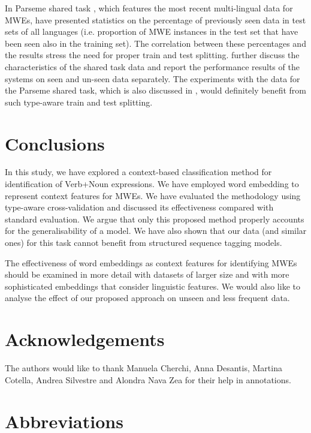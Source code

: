 \documentclass[output=paper
,modfonts
,nonflat]{langsci/langscibook}
\begin{document}
In Parseme shared task \citep{MWEWorkshop}, which features the most recent multi-lingual data for MWEs, \cite{maldonado2017} have presented statistics on the percentage of previously seen data in test sets of all languages (i.e. proportion of MWE instances in the test set that have been seen also in the training set). The correlation between these percentages and the results stress the need for proper train and test splitting.   further discuss the characteristics of the shared task data and report the performance results of the systems on seen and un-seen data separately.  
The experiments with the data for the Parseme shared task, which is also discussed in , would definitely benefit from such type-aware train and test splitting.

\section{Conclusions}
In this study, we have explored a context-based classification method for identification of Verb+Noun expressions. We have employed word embedding to represent context features for MWEs. We have evaluated the methodology using type-aware cross-validation and discussed its effectiveness compared with standard evaluation. We argue that only this proposed method properly accounts for the generalisability of a model. We have also shown that our data (and similar ones) for this task cannot benefit from structured sequence tagging models.

The effectiveness of word embeddings as context features for identifying MWEs should be examined in more detail with datasets of larger size and with more sophisticated embeddings that consider linguistic features. We would also like to analyse the effect of our proposed approach on unseen and less frequent data. 


\section*{Acknowledgements}
The authors would like to thank Manuela Cherchi, Anna Desantis, Martina Cotella, Andrea Silvestre and Alondra Nava Zea for their help in annotations.

\section*{Abbreviations}
\end{document}
